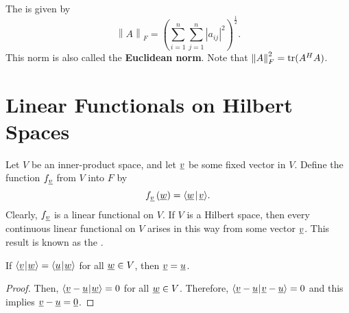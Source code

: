 The  is given by
\begin{equation*}
\left\| A \right\|_F = \left( \sum_{i=1}^n \sum_{j=1}^n |a_{ij}|^2 \right)^{\frac{1}{2}} .
\end{equation*}
This norm is also called the \textbf{Euclidean norm}.
Note that $\left\| A \right\|_F^2 = \mathrm{tr} (A^H A)$.


\section{Linear Functionals on Hilbert Spaces}

Let $V$ be an inner-product space, and let $\underline{v}$ be some fixed vector in $V$.
Define the function $f_{\underline{v}}$ from $V$ into $F$ by
\begin{equation*}
f_{\underline{v}} \left( \underline{w} \right)
= {\left\langle  \underline{w}  \mskip2mu \middle| \mskip2mu  \underline{v}  \right\rangle} .
\end{equation*}
Clearly, $f_{\underline{v}}$ is a linear functional on $V$.
If $V$ is a Hilbert space, then every continuous linear functional on $V$ arises in this way from some vector $\underline{v}$.
This result is known as the .

\begin{lemma} \label{lemma:DualSpaceSeparatesPoints}
If ${\langle  \underline{v}  \mskip1mu | \mskip1mu  \underline{w}  \rangle} = {\langle  \underline{u}  \mskip1mu | \mskip1mu  \underline{w}  \rangle}$ for all $\underline{w} \in V$, then $\underline{v} = \underline{u}$.
\end{lemma}
\begin{proof}
Then, ${\langle  \underline{v} - \underline{u}  \mskip1mu | \mskip1mu  \underline{w}  \rangle} = 0$ for all $\underline{w} \in V$.
Therefore, ${\langle  \underline{v} - \underline{u}  \mskip1mu | \mskip1mu  \underline{v} - \underline{u}  \rangle} = 0$ and this implies $\underline{v} - \underline{u} = \underline{0}$.
\end{proof}

